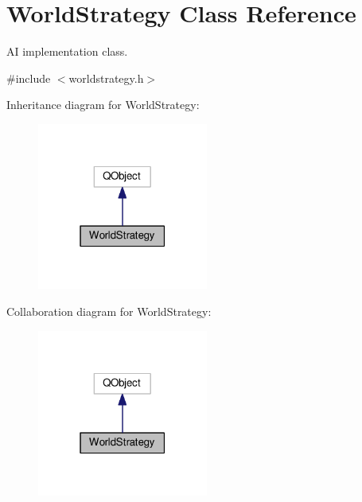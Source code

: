 \hypertarget{classWorldStrategy}{}\section{World\+Strategy Class Reference}
\label{classWorldStrategy}


AI implementation class.  




{\ttfamily \#include $<$worldstrategy.\+h$>$}



Inheritance diagram for World\+Strategy\+:\nopagebreak
\begin{figure}[H]
\begin{center}
\leavevmode
\includegraphics[width=159pt]{d0/dc9/classWorldStrategy__inherit__graph}
\end{center}
\end{figure}


Collaboration diagram for World\+Strategy\+:\nopagebreak
\begin{figure}[H]
\begin{center}
\leavevmode
\includegraphics[width=159pt]{d2/de1/classWorldStrategy__coll__graph}
\end{center}
\end{figure}

